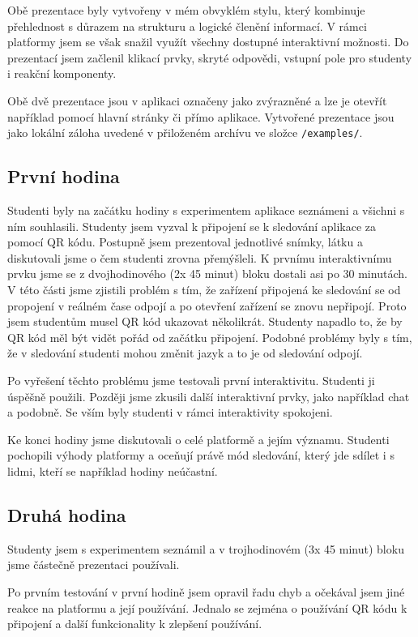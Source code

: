 Obě prezentace byly vytvořeny v mém obvyklém stylu, který kombinuje přehlednost s důrazem na strukturu a logické členění informací.
V rámci platformy jsem se však snažil využít všechny dostupné interaktivní možnosti.
Do prezentací jsem začlenil klikací prvky, skryté odpovědi, vstupní pole pro studenty i reakční komponenty.

Obě dvě prezentace jsou v aplikaci označeny jako zvýrazněné a lze je otevřít například pomocí hlavní stránky či přímo aplikace.
Vytvořené prezentace jsou jako lokální záloha uvedené v přiloženém archívu ve složce \verb|/examples/|.

\subsection{První hodina}

Studenti byly na začátku hodiny s experimentem aplikace seznámeni a všichni s ním souhlasili.
Studenty jsem vyzval k připojení se k sledování aplikace za pomocí QR kódu.
Postupně jsem prezentoval jednotlivé snímky, látku a diskutovali jsme o čem studenti zrovna přemýšleli.
K prvnímu interaktivnímu prvku jsme se z dvojhodinového (2x 45 minut) bloku dostali asi po 30 minutách.
V této části jsme zjistili problém s tím, že zařízení připojená ke sledování se od propojení v reálném čase odpojí a po otevření zařízení se znovu nepřipojí.
Proto jsem studentům musel QR kód ukazovat několikrát.
Studenty napadlo to, že by QR kód měl být vidět pořád od začátku připojení.
Podobné problémy byly s tím, že v sledování studenti mohou změnit jazyk a to je od sledování odpojí.

Po vyřešení těchto problému jsme testovali první interaktivitu.
Studenti ji úspěšně použili.
Později jsme zkusili další interaktivní prvky, jako například chat a podobně.
Se vším byly studenti v rámci interaktivity spokojeni.

Ke konci hodiny jsme diskutovali o celé platformě a jejím významu.
Studenti pochopili výhody platformy a oceňují právě mód sledování, který jde sdílet i s lidmi, kteří se například hodiny neúčastní.

\subsection{Druhá hodina}

Studenty jsem s experimentem seznámil a v trojhodinovém (3x 45 minut) bloku jsme částečně prezentaci používali.

Po prvním testování v první hodině jsem opravil řadu chyb a očekával jsem jiné reakce na platformu a její používání.
Jednalo se zejména o používání QR kódu k připojení a další funkcionality k zlepšení používání. 

